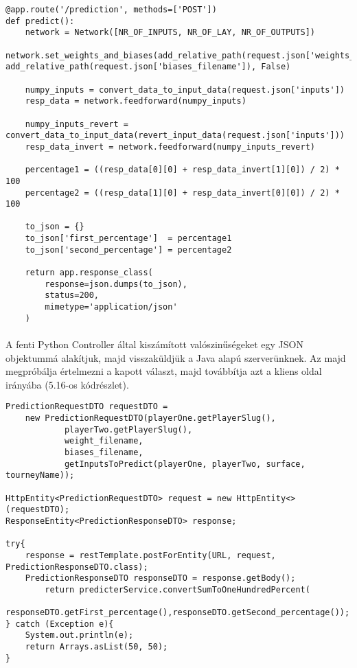 \begin{lstlisting}[caption=A Predict Controller a Python szerver esetén:]
@app.route('/prediction', methods=['POST'])
def predict():
    network = Network([NR_OF_INPUTS, NR_OF_LAY, NR_OF_OUTPUTS])
    network.set_weights_and_biases(add_relative_path(request.json['weights_filename']), add_relative_path(request.json['biases_filename']), False)
    
    numpy_inputs = convert_data_to_input_data(request.json['inputs'])
    resp_data = network.feedforward(numpy_inputs)

    numpy_inputs_revert = convert_data_to_input_data(revert_input_data(request.json['inputs']))
    resp_data_invert = network.feedforward(numpy_inputs_revert)

    percentage1 = ((resp_data[0][0] + resp_data_invert[1][0]) / 2) * 100
    percentage2 = ((resp_data[1][0] + resp_data_invert[0][0]) / 2) * 100

    to_json = {}
    to_json['first_percentage']  = percentage1
    to_json['second_percentage'] = percentage2
	
    return app.response_class(
        response=json.dumps(to_json),
        status=200,
        mimetype='application/json'
    )    
\end{lstlisting}

\paragraph{}
A fenti Python Controller által kiszámított valószinűségeket egy JSON objektummá alakítjuk, majd visszaküldjük a Java alapú szerverünknek. Az majd megpróbálja értelmezni a kapott választ, majd továbbítja azt a kliens oldal irányába (5.16-os kódrészlet).

\begin{lstlisting}[caption=Szerverek közti kommunikáció]
PredictionRequestDTO requestDTO = 
	new PredictionRequestDTO(playerOne.getPlayerSlug(), 
			playerTwo.getPlayerSlug(), 
			weight_filename,
			biases_filename, 
			getInputsToPredict(playerOne, playerTwo, surface, tourneyName));
			
HttpEntity<PredictionRequestDTO> request = new HttpEntity<>(requestDTO);
ResponseEntity<PredictionResponseDTO> response;

try{
    response = restTemplate.postForEntity(URL, request, PredictionResponseDTO.class);
    PredictionResponseDTO responseDTO = response.getBody();
        return predicterService.convertSumToOneHundredPercent(
          responseDTO.getFirst_percentage(),responseDTO.getSecond_percentage());
} catch (Exception e){
    System.out.println(e);
    return Arrays.asList(50, 50);
}
\end{lstlisting}